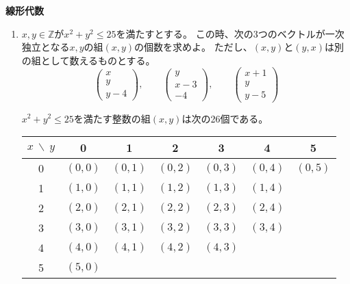 \documentclass[12pt,b5paper]{ltjsarticle}
\begin{document}
\hrulefill
\textbf{線形代数}
\hrulefill

\begin{enumerate}
 \item
      $x,y\in\mathbb{Z}$が$x^2 + y^2 \leq 25$を満たすとする。
      この時、次の3つのベクトルが一次独立となる$x,y$の組$(x,y)$の個数を求めよ。
      ただし、$(x,y)$と$(y,x)$は別の組として数えるものとする。
     \begin{equation}
      \begin{pmatrix}x\\y\\y-4\end{pmatrix}
      ,\qquad
      \begin{pmatrix}y\\x-3\\-4\end{pmatrix}
      ,\qquad
      \begin{pmatrix}x+1\\y\\y-5\end{pmatrix}
     \end{equation}

      \dotfill

      $x^2 + y^2 \leq 25$を満たす整数の組$(x,y)$は次の26個である。
      \begin{center}
       \begin{tabular}{c||cccccc}
        $x\ \backslash\ y$ & 0 & 1 & 2 & 3 & 4 & 5 \\
        \hline\hline
        0 & $(0,0)$ & $(0,1)$ & $(0,2)$ & $(0,3)$ & $(0,4)$ & $(0,5)$ \\
        1 & $(1,0)$ & $(1,1)$ & $(1,2)$ & $(1,3)$ & $(1,4)$ & \\
        2 & $(2,0)$ & $(2,1)$ & $(2,2)$ & $(2,3)$ & $(2,4)$ & \\
        3 & $(3,0)$ & $(3,1)$ & $(3,2)$ & $(3,3)$ & $(3,4)$ & \\
        4 & $(4,0)$ & $(4,1)$ & $(4,2)$ & $(4,3)$ & & \\
        5 & $(5,0)$ & & & & &
       \end{tabular}
      \end{center}

      \dotfill


\end{enumerate}
\end{document}
